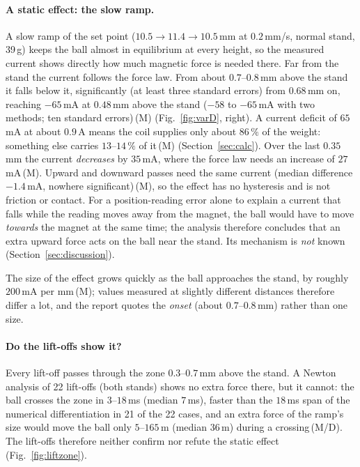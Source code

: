 \documentclass[11pt,a4paper]{article}
\newcommand{\st}[1]{\,\textup{(#1)}}
\begin{document}
\paragraph{A static effect: the slow ramp.} A slow ramp of the set point ($10.5 \to 11.4 \to 10.5$\,mm at $0.2$\,mm/s, normal
stand, 39\,g) keeps the ball almost in equilibrium at every height, so the measured current shows directly how much magnetic
force is needed there. Far from the stand the current follows the force law. From about $0.7$--$0.8$\,mm above the stand it
falls below it, significantly (at least three standard errors) from $0.68$\,mm on, reaching $-65$\,mA at $0.48$\,mm above the
stand ($-58$ to $-65$\,mA with two methods; ten standard errors)\st{M} (Fig.~\ref{fig:varD}, right). A current deficit of
$65$\,mA at about $0.9$\,A means the coil supplies only about $86\,\%$ of the weight: something else carries $13$--$14\,\%$ of
it\st{M} (Section~\ref{sec:calc}). Over the last $0.35$\,mm the current \emph{decreases} by $35$\,mA, where the force law needs
an increase of $27$\,mA\st{M}. Upward and downward passes need the same current (median difference $-1.4$\,mA, nowhere
significant)\st{M}, so the effect has no hysteresis and is not friction or contact. For a position-reading error alone to explain a
current that falls while the reading moves away from the magnet, the ball would have to move \emph{towards} the magnet at the
same time; the analysis therefore concludes that an extra upward force acts on the ball near the stand. Its mechanism is \emph{not} known (Section~\ref{sec:discussion}).

The size of the effect grows quickly as the ball approaches the stand, by roughly $200$\,mA per mm\st{M}; values measured at
slightly different distances therefore differ a lot, and the report quotes the \emph{onset} (about $0.7$--$0.8$\,mm) rather
than one size.

\paragraph{Do the lift-offs show it?} Every lift-off passes through the zone $0.3$--$0.7$\,mm above the stand. A Newton
analysis of 22 lift-offs (both stands) shows no extra force there, but it cannot: the ball crosses the zone in $3$--$18$\,ms
(median $7$\,ms), faster than the $18$\,ms span of the numerical differentiation in 21 of the 22 cases, and an extra force of
the ramp's size would move the ball only $5$--$165$\,\textmu m (median $36$\,\textmu m) during a crossing\st{M/D}. The
lift-offs therefore neither confirm nor refute the static effect (Fig.~\ref{fig:liftzone}).
\end{document}
